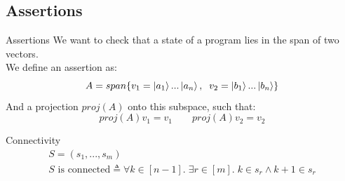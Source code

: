 \documentclass[11pt,svgnames,smaller,aspectratio=43,english]{beamer}
\begin{document}
\subsection{Assertions}
\begin{frame}{Assertions}
	We want to check that a state of a program lies in the span of two vectors.\\
	We define an assertion as:
	\begin{equation*}
		A = span\{v_1 = \ket{a_1}...\ket{a_n},\;\; v_2 = \ket{b_1}...\ket{b_n}\}
	\end{equation*}
	And a projection $proj(A)$ onto this subspace, such that:
	\begin{equation*}
		proj(A)v_1 = v_1 \qquad proj(A)v_2 = v_2
	\end{equation*}
\end{frame}

\begin{frame}{Connectivity}
	\begin{gather*}
		S = (s_1, ..., s_m)\\
		S \text{ is connected} \triangleq \forall k \in [n-1].\; \exists r \in [m].\; k \in s_r \land k+1 \in s_r
	\end{gather*}

	\vspace*{1em}
\end{frame}
\end{document}

